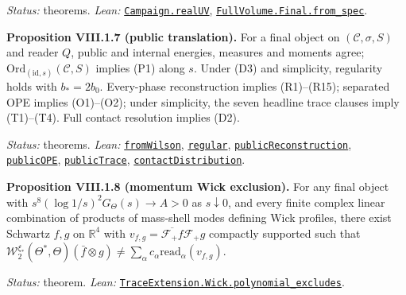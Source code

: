 \documentclass[
  letterpaper,
  11pt]{article}
\begin{document}
\emph{Status:} theorems. \emph{Lean:}
\href{https://github.com/yang-mills-group/OpenAI-YM-20261028/blob/3456e5e75cf8d4cd558955a5c7638fba2d68f464/YM/FullVolume/Fields/Filled.lean\#L45}{\texttt{Campaign.realUV}},
\href{https://github.com/yang-mills-group/OpenAI-YM-20261028/blob/3456e5e75cf8d4cd558955a5c7638fba2d68f464/YM/FullVolume/Finale/Program.lean\#L117-L126}{\texttt{FullVolume.Final.from\_spec}}.

\textbf{Proposition VIII.1.7 (public translation).} For a final object
on \((\mathcal C,\sigma,S)\) and reader \(Q\), public and internal
energies, measures and moments agree;
\(\mathrm{Ord}_{(\mathrm{id},s)}(\mathcal C,S)\) implies (P1) along
\(s\). Under (D3) and simplicity, regularity holds with \(b_*=2b_0\).
Every-phase reconstruction implies (R1)--(R15); separated OPE implies
(O1)--(O2); under simplicity, the seven headline trace clauses imply
(T1)--(T4). Full contact resolution implies (D2).

\emph{Status:} theorems. \emph{Lean:}
\href{https://github.com/yang-mills-group/OpenAI-YM-20261028/blob/3456e5e75cf8d4cd558955a5c7638fba2d68f464/WilsonBridge.lean\#L62-L67}{\texttt{fromWilson}},
\href{https://github.com/yang-mills-group/OpenAI-YM-20261028/blob/3456e5e75cf8d4cd558955a5c7638fba2d68f464/HierarchyBridge.lean\#L16-L25}{\texttt{regular}},
\href{https://github.com/yang-mills-group/OpenAI-YM-20261028/blob/3456e5e75cf8d4cd558955a5c7638fba2d68f464/HierarchyBridge.lean\#L79-L133}{\texttt{publicReconstruction}},
\href{https://github.com/yang-mills-group/OpenAI-YM-20261028/blob/3456e5e75cf8d4cd558955a5c7638fba2d68f464/HierarchyBridge.lean\#L68-L77}{\texttt{publicOPE}},
\href{https://github.com/yang-mills-group/OpenAI-YM-20261028/blob/3456e5e75cf8d4cd558955a5c7638fba2d68f464/TraceBridge.lean\#L35-L44}{\texttt{publicTrace}},
\href{https://github.com/yang-mills-group/OpenAI-YM-20261028/blob/3456e5e75cf8d4cd558955a5c7638fba2d68f464/ContactBridge.lean\#L14-L49}{\texttt{contactDistribution}}.

\textbf{Proposition VIII.1.8 (momentum Wick exclusion).} For any final
object with \(s^8(\log1/s)^2G_\Theta(s)\to A>0\) as \(s\downarrow0\),
and every finite complex linear combination of products of mass-shell
modes defining Wick profiles, there exist Schwartz \(f,g\) on
\(\mathbb R^4\) with \(v_{f,g}=\overline{\mathcal F_+f}\mathcal F_+g\)
compactly supported such that
\(\mathcal W^{\xi_*}_2(\Theta^*,\Theta)(\bar f\otimes g)\ne\sum_\alpha c_\alpha\mathrm{read}_\alpha(v_{f,g})\).

\emph{Status:} theorem. \emph{Lean:}
\href{https://github.com/yang-mills-group/OpenAI-YM-20261028/blob/3456e5e75cf8d4cd558955a5c7638fba2d68f464/YM/TraceExtension/Wick/Refute.lean\#L86-L105}{\texttt{TraceExtension.Wick.polynomial\_excludes}}.
\end{document}
